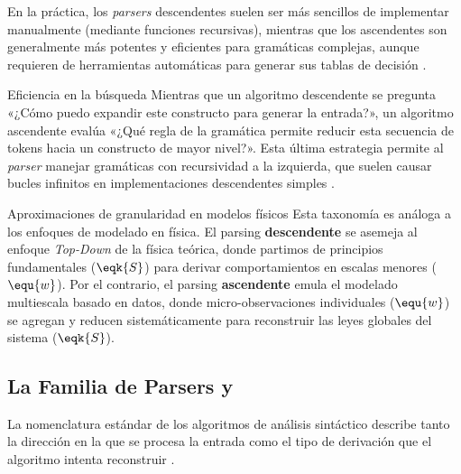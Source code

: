 En la práctica, los \textit{parsers} descendentes suelen ser más sencillos de implementar manualmente (mediante funciones recursivas), mientras que los ascendentes son generalmente más potentes y eficientes para gramáticas complejas, aunque requieren de herramientas automáticas para generar sus tablas de decisión \cite{aho2006compilers}.

\begin{observacion}{Eficiencia en la búsqueda}
Mientras que un algoritmo descendente se pregunta «¿Cómo puedo expandir este constructo para generar la entrada?», un algoritmo ascendente evalúa «¿Qué regla de la gramática permite reducir esta secuencia de tokens hacia un constructo de mayor nivel?». Esta última estrategia permite al \textit{parser} manejar gramáticas con recursividad a la izquierda, que suelen causar bucles infinitos en implementaciones descendentes simples \cite{aho2006compilers}.
\end{observacion}

\begin{fisicaconexion}{Aproximaciones de granularidad en modelos físicos}
Esta taxonomía es análoga a los enfoques de modelado en física. El parsing \textbf{descendente} se asemeja al enfoque \textit{Top-Down} de la física teórica, donde partimos de principios fundamentales ($\eqk{S}$) para derivar comportamientos en escalas menores ($\equ{w}$). Por el contrario, el parsing \textbf{ascendente} emula el modelado multiescala basado en datos, donde micro-observaciones individuales ($\equ{w}$) se agregan y reducen sistemáticamente para reconstruir las leyes globales del sistema ($\eqk{S}$).
\end{fisicaconexion}

\subsection{La Familia de Parsers  y }
\label{subsec:3_4_3_familia_parsers}

La nomenclatura estándar de los algoritmos de análisis sintáctico describe tanto la dirección en la que se procesa la entrada como el tipo de derivación que el algoritmo intenta reconstruir \cite{aho2006compilers}.

